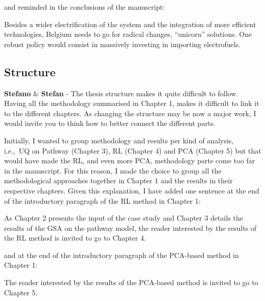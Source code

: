 \documentclass[12pt,a4paper]{article}
\def\ie{i.e.,\ }
\begin{document}
and reminded {\color{blue}in the conclusions of the manuscript}:

\begin{mdframed}[style=manuscript] %
Besides a wider electrification of the system and the integration of more efficient technologies, Belgium needs to go for radical changes, ``unicorn'' solutions. One robust policy would consist in massively investing in importing electrofuels.
\end{mdframed}

\subsection{Structure}
\label{structure}

\begin{mdframed}[style=comment] %
{\color{orange} \textbf{Stefano}} \& {\color{teal} \textbf{Stefan}} - The thesis structure makes it quite difficult to follow. Having all the methodology summarised in Chapter 1, makes it difficult to link it to the different chapters. As changing the structure may be now a major work, I would invite you to think how to better connect the different parts. 
\end{mdframed}

\noindent Initially, I wanted to group methodology and results per kind of analysis, \ie UQ on Pathway (Chapter 3), RL (Chapter 4) and PCA (Chapter 5) but that would have made the RL, and even more PCA, methodology parts come too far in the manuscript. For this reason, I made the choice to group all the methodological approaches together in Chapter 1 and the results in their respective chapters.  Given this explanation, I have added one sentence {\color{blue}at the end of the introductory paragraph of the RL method in Chapter 1}:

\begin{mdframed}[style=manuscript] %
As Chapter 2 presents the input of the case study and Chapter 3 details the results of the GSA on the pathway model, the reader interested by the results of the RL method is invited to go to Chapter 4.
\end{mdframed}

\noindent and {\color{blue}at the end of the introductory paragraph of the PCA-based method in Chapter 1}:

\begin{mdframed}[style=manuscript] %
The reader interested by the results of the PCA-based method is invited to go to Chapter 5.
\end{mdframed}
\end{document}

